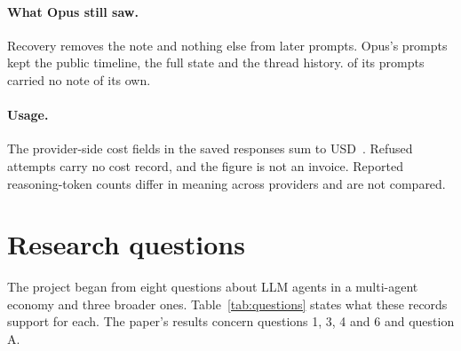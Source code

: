 \paragraph{What Opus still saw.}
Recovery removes the note and nothing else from later prompts. Opus's prompts kept the public timeline, the full state and the thread history.  of its  prompts carried no note of its own.

\paragraph{Usage.}
The provider-side cost fields in the saved responses sum to USD~. Refused attempts carry no cost record, and the figure is not an invoice. Reported reasoning-token counts differ in meaning across providers and are not compared.

\section{Research questions}
\label{app:questions}

The project began from eight questions about LLM agents in a multi-agent economy and three broader ones. Table~\ref{tab:questions} states what these records support for each. The paper's results concern questions 1, 3, 4 and 6 and question A.

